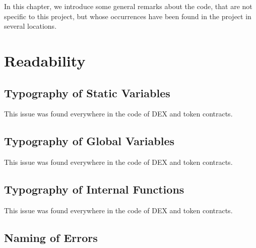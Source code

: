 
In this chapter, we introduce some general remarks about the code,
that are not specific to this project, but whose occurrences have been
found in the project in several locations.

\section{Readability}

\subsection{Typography of Static Variables}
\label{readability:static}


This issue was found everywhere in the code of DEX and token
contracts.\\

\subsection{Typography of Global Variables}
\label{readability:global}


This issue was found everywhere in the code of DEX and token contracts.\\

\subsection{Typography of Internal Functions}
\label{readability:internal}


This issue was found everywhere in the code of DEX and token contracts.\\

\subsection{Naming of Errors}
\label{readability:errors}

